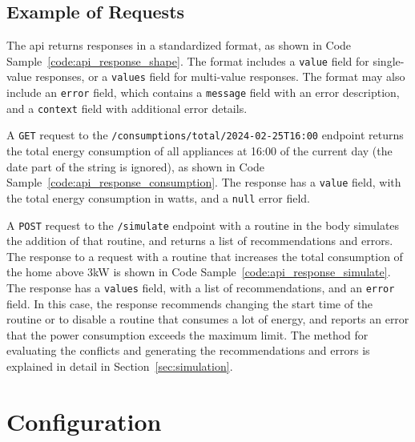 \newpage

\subsection{Example of Requests}



The \acrshort{api} returns responses in a standardized format, as shown in Code Sample~\ref{code:api_response_shape}. The format includes a \texttt{value} field for single-value responses, or a \texttt{values} field for multi-value responses. The format may also include an \texttt{error} field, which contains a \texttt{message} field with an error description, and a \texttt{context} field with additional error details.



A \texttt{GET} request to the \texttt{/consumptions/total/2024-02-25T16:00} endpoint returns the total energy consumption of all appliances at 16:00 of the current day (the date part of the string is ignored), as shown in Code Sample~\ref{code:api_response_consumption}. The response has a \texttt{value} field, with the total energy consumption in watts, and a \texttt{null} error field.



A \texttt{POST} request to the \texttt{/simulate} endpoint with a routine in the body simulates the addition of that routine, and returns a list of recommendations and errors. The response to a request with a routine that increases the total consumption of the home above 3kW is shown in Code Sample~\ref{code:api_response_simulate}. The response has a \texttt{values} field, with a list of recommendations, and an \texttt{error} field. In this case, the response recommends changing the start time of the routine or to disable a routine that consumes a lot of energy, and reports an error that the power consumption exceeds the maximum limit. The method for evaluating the conflicts and generating the recommendations and errors is explained in detail in Section~\ref{sec:simulation}.

\section{Configuration}



